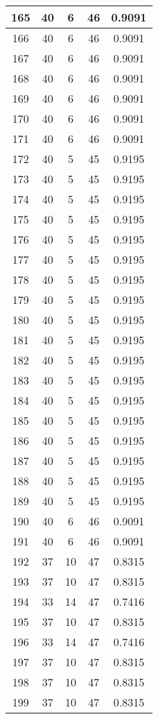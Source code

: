 \documentclass[letterpaper, 12pt]{article}
\begin{document}
\begin{longtable}{|c|c|c|c|c|}
\hline
165 & 40 & 6 & 46 & 0.9091 \\
\hline
166 & 40 & 6 & 46 & 0.9091 \\
\hline
167 & 40 & 6 & 46 & 0.9091 \\
\hline
168 & 40 & 6 & 46 & 0.9091 \\
\hline
169 & 40 & 6 & 46 & 0.9091 \\
\hline
170 & 40 & 6 & 46 & 0.9091 \\
\hline
171 & 40 & 6 & 46 & 0.9091 \\
\hline
172 & 40 & 5 & 45 & 0.9195 \\
\hline
173 & 40 & 5 & 45 & 0.9195 \\
\hline
174 & 40 & 5 & 45 & 0.9195 \\
\hline
175 & 40 & 5 & 45 & 0.9195 \\
\hline
176 & 40 & 5 & 45 & 0.9195 \\
\hline
177 & 40 & 5 & 45 & 0.9195 \\
\hline
178 & 40 & 5 & 45 & 0.9195 \\
\hline
179 & 40 & 5 & 45 & 0.9195 \\
\hline
180 & 40 & 5 & 45 & 0.9195 \\
\hline
181 & 40 & 5 & 45 & 0.9195 \\
\hline
182 & 40 & 5 & 45 & 0.9195 \\
\hline
183 & 40 & 5 & 45 & 0.9195 \\
\hline
184 & 40 & 5 & 45 & 0.9195 \\
\hline
185 & 40 & 5 & 45 & 0.9195 \\
\hline
186 & 40 & 5 & 45 & 0.9195 \\
\hline
187 & 40 & 5 & 45 & 0.9195 \\
\hline
188 & 40 & 5 & 45 & 0.9195 \\
\hline
189 & 40 & 5 & 45 & 0.9195 \\
\hline
190 & 40 & 6 & 46 & 0.9091 \\
\hline
191 & 40 & 6 & 46 & 0.9091 \\
\hline
192 & 37 & 10 & 47 & 0.8315 \\
\hline
193 & 37 & 10 & 47 & 0.8315 \\
\hline
194 & 33 & 14 & 47 & 0.7416 \\
\hline
195 & 37 & 10 & 47 & 0.8315 \\
\hline
196 & 33 & 14 & 47 & 0.7416 \\
\hline
197 & 37 & 10 & 47 & 0.8315 \\
\hline
198 & 37 & 10 & 47 & 0.8315 \\
\hline
199 & 37 & 10 & 47 & 0.8315 \\
\hline
\end{longtable}
\end{document}
